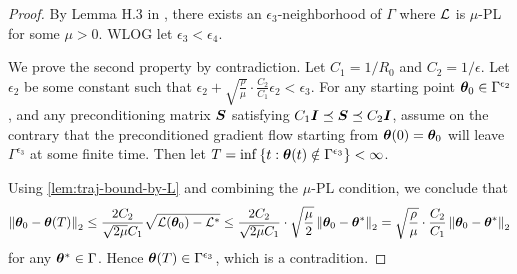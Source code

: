 \begin{proof}
    By Lemma H.3 in \citet{lyu2022understanding}, there exists an $\epsilon_3$-neighborhood of $\Gamma$ where $\mathcal{L}$ is $\mu$-PL for some $\mu > 0$. WLOG let $\epsilon_3 < \epsilon_4$.
    

    We prove the second property by contradiction. Let $C_1 = 1/R_0$ and $C_2 = 1/\epsilon$. Let $\epsilon_2$ be some constant such that $\epsilon_2 + \sqrt{\frac{\rho}{\mu}}\cdot \frac{C_2}{C_1}\epsilon_2 < \epsilon_3$. For any starting point ${\bm{\theta}}_0 \in \Gamma^{\epsilon_2}$, and any preconditioning matrix ${\bm{S}}$ satisfying $C_1{\bm{I}} \preceq {\bm{S}} \preceq C_2{\bm{I}}$, assume on the contrary that the preconditioned gradient flow starting from ${\bm{\theta}}(0) = {\bm{\theta}}_0$ will leave $\Gamma^{\epsilon_3}$ at some finite time. Then let $T = \inf \left\{t: {\bm{\theta}}(t) \notin \Gamma^{\epsilon_3}\right\} < \infty$. 
    
    Using \cref{lem:traj-bound-by-L} and combining the $\mu$-PL condition, we conclude that $$\left\|{\bm{\theta}}_0 - {\bm{\theta}}(T)\right\|_2 \leq \frac{2C_2}{\sqrt{2\mu}C_1} \sqrt{\mathcal{L}({\bm{\theta}}_0)-\mathcal{L}^*} \leq \frac{2C_2}{\sqrt{2\mu}C_1}\cdot \sqrt{\frac{\mu}{2}} \left\|{\bm{\theta}}_0 - {\bm{\theta}}^*\right\|_2 = \sqrt{\frac{\rho}{\mu}}\cdot \frac{C_2}{C_1}\left\|{\bm{\theta}}_0 - {\bm{\theta}}^*\right\|_2$$
    for any ${\bm{\theta}}^* \in \Gamma$. Hence ${\bm{\theta}}(T) \in \Gamma^{\epsilon_3}$, which is a contradition.
    
    
    

    
    

\end{proof}
